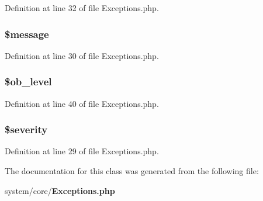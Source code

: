 Definition at line 32 of file Exceptions.\-php.

\subsubsection[{\$message}]{\setlength{\rightskip}{0pt plus 5cm}\$message}\label{class_c_i___exceptions_abf17cb2dba2ed17cb28aa5f37deb5293}


Definition at line 30 of file Exceptions.\-php.

\subsubsection[{\$ob\-\_\-level}]{\setlength{\rightskip}{0pt plus 5cm}\$ob\-\_\-level}\label{class_c_i___exceptions_abb6b6587dbaf0238bf26829c8df05d59}


Definition at line 40 of file Exceptions.\-php.

\subsubsection[{\$severity}]{\setlength{\rightskip}{0pt plus 5cm}\$severity}\label{class_c_i___exceptions_a85759894d444d7191251479d87eaf8c6}


Definition at line 29 of file Exceptions.\-php.



The documentation for this class was generated from the following file\-:\begin{DoxyCompactItemize}
\item 
system/core/{\bf Exceptions.\-php}\end{DoxyCompactItemize}

